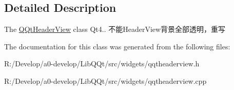 \subsection{Detailed Description}
The \mbox{\hyperlink{class_q_qt_header_view}{Q\+Qt\+Header\+View}} class Qt4.. 不能\+Header\+View背景全部透明，重写 

The documentation for this class was generated from the following files\+:\begin{DoxyCompactItemize}
\item 
R\+:/\+Develop/a0-\/develop/\+Lib\+Q\+Qt/src/widgets/qqtheaderview.\+h\item 
R\+:/\+Develop/a0-\/develop/\+Lib\+Q\+Qt/src/widgets/qqtheaderview.\+cpp\end{DoxyCompactItemize}
